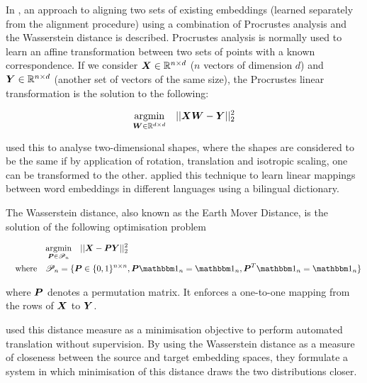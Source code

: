 In \cite{UnsupervisedAlignmentWP}, an approach to aligning two sets of existing embeddings (learned separately from the alignment procedure) using a combination of Procrustes analysis and the Wasserstein distance is described. Procrustes analysis is normally used to learn an affine transformation between two sets of points with a known correspondence. If we consider $\boldsymbol{X} \in \mathbb{R}^{n \times d}$ ($n$ vectors of dimension $d$) and $\boldsymbol{Y} \in \mathbb{R}^{n \times d}$ (another set of vectors of the same size), the Procrustes linear transformation is the solution to the following:

\begin{equation*}
    \underset{\boldsymbol{W} \in \mathbb{R}^{d \times d}}{\operatorname{argmin}} \quad  ||\boldsymbol{X} \boldsymbol{W} - \boldsymbol{Y}||_2^2
\end{equation*}

\cite{Goodall1991ProcrustesMI} used this to analyse two-dimensional shapes, where the shapes are considered to be the same if by application of rotation, translation and isotropic scaling, one can be transformed to the other. \cite{MikolovMachineTranslation} applied this technique to learn linear mappings between word embeddings in different languages using a bilingual dictionary. 

The Wasserstein distance, also known as the Earth Mover Distance, is the solution of the following optimisation problem

\begin{equation}
\label{eq:wasserstein}
\begin{split}
    &\argmin{\vecP \in \mathscr{P}_n} \quad || \vecX - \vecP \vecY ||_2^2 \\
    \spaced{where}&\mathscr{P}_n = \{\vecP \in \{0, 1\}^{n \times n}, \vecP \one_n = \one_n, \vecP^T \one_n = \one_n \}
\end{split}
\end{equation}

where $\boldsymbol{P}$ denotes a permutation matrix. It enforces a one-to-one mapping from the rows of $\boldsymbol{X}$ to $\boldsymbol{Y}$.


\cite{Zhang2017EarthMD} used this distance measure as a minimisation objective to perform automated translation without supervision. By using the Wasserstein distance as a measure of closeness between the source and target embedding spaces, they formulate a system in which minimisation of this distance draws the two distributions closer. %

